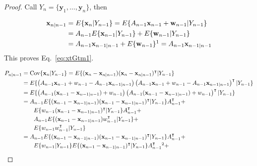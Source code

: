 \begin{proof}
    Call $Y_n=\{\mathbf{y}_1,\ldots,\mathbf{y}_n\}$, then

    \begin{align}
        \mathbf{x}_{n|n-1}&=E\{\mathbf{x}_n|Y_{n-1}\}=E\{A_{n-1}\mathbf{x}_{n-1}+\mathbf{w}_{n-1}|Y_{n-1}\}\nonumber\\
                          &=A_{n-1}E\{\mathbf{x}_{n-1}|Y_{n-1}\}+E\{\mathbf{w}_{n-1}|Y_{n-1}\}\nonumber\\
                          &=A_{n-1}\mathbf{x}_{n-1|n-1}+E\{\mathbf{w}_{n-1}\}\footnotemark[1]=A_{n-1}\mathbf{x}_{n-1|n-1}\nonumber
    \end{align}
	This proves Eq.~\ref{eq:xtGtm1}.

    \begin{align}
        P_{n|n-1}&=\text{Cov}\{\mathbf{x}_n|Y_{n-1}\}=E\{(\mathbf{x}_n-\mathbf{x}_{n|n-1})(\mathbf{x}_n-\mathbf{x}_{n|n-1})^\intercal|Y_{n-1}\}\nonumber\\
                          &=E\{\left(A_{n-1}\mathbf{x}_{n-1}+w_{n-1}-A_{n-1}\mathbf{x}_{n-1|n-1}\right)\left(A_{n-1}\mathbf{x}_{n-1}+w_{n-1}-A_{n-1}\mathbf{x}_{n-1|n-1}\right)^\intercal|Y_{n-1}\}\nonumber\\
                          &=E\{\left(A_{n-1}(\mathbf{x}_{n-1}-\mathbf{x}_{n-1|n-1})+w_{n-1}\right)\left(A_{n-1}(\mathbf{x}_{n-1}-\mathbf{x}_{n-1|n-1})+w_{n-1}\right)^\intercal|Y_{n-1}\}\nonumber\\
                          &=A_{n-1}E\{(\mathbf{x}_{n-1}-\mathbf{x}_{n-1|n-1})(\mathbf{x}_{n-1}-\mathbf{x}_{n-1|n-1})^\intercal|Y_{n-1}\}A_{n-1}^\intercal+\nonumber\\
                          &\qquad E\{w_{n-1}(\mathbf{x}_{n-1}-\mathbf{x}_{n-1|n-1})^\intercal|Y_{n-1}\}A_{n-1}^\intercal+\nonumber\\
                          &\qquad A_{n-1}E\{(\mathbf{x}_{n-1}-\mathbf{x}_{n-1|n-1})w_{n-1}^\intercal|Y_{n-1}\}+\nonumber\\
                          &\qquad E\{w_{n-1}w_{n-1}^\intercal|Y_{n-1}\}\nonumber\\
                          &=A_{n-1}E\{(\mathbf{x}_{n-1}-\mathbf{x}_{n-1|n-1})(\mathbf{x}_{n-1}-\mathbf{x}_{n-1|n-1})^\intercal|Y_{n-1}\}A_{n-1}^\intercal+\nonumber\\
                          &\qquad E\{w_{n-1}|Y_{n-1}\}E\{(\mathbf{x}_{n-1}-\mathbf{x}_{n-1|n-1})^\intercal|Y_{n-1}\}A_{n-1}^\intercal\footnotemark[2]+\nonumber\\

\end{align}
\end{proof}
